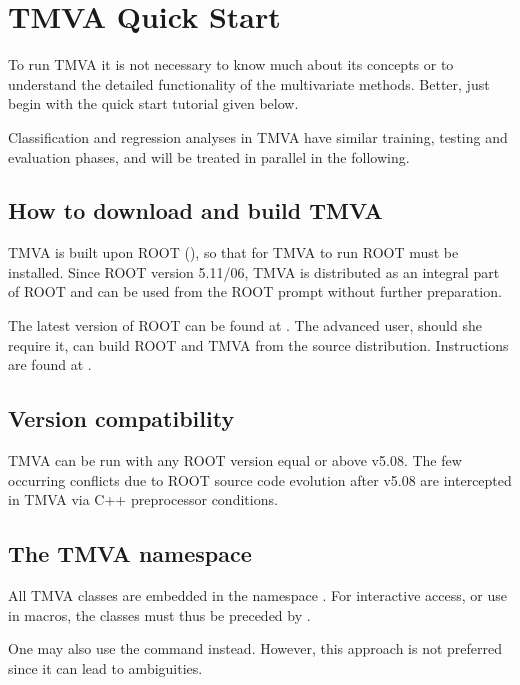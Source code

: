 \section{TMVA Quick Start}
\label{sec:quickstart}

To run TMVA it is not necessary to know much about its concepts or to understand 
the detailed functionality of the multivariate methods. Better, just begin 
with the quick start tutorial given below.

Classification and regression analyses in TMVA have similar training, testing and 
evaluation phases, and will be treated in parallel in the following. 

\subsection{How to download and build TMVA}
\label{sec:download}

TMVA is built upon ROOT (), so that for TMVA to run ROOT must be installed. Since ROOT version 5.11/06, TMVA is distributed as an integral part of ROOT and can be used from the ROOT prompt without further preparation.

The latest version of ROOT can be found at . The advanced user, should she require it, can build ROOT and TMVA from the source distribution. Instructions are found at .

\subsection{Version compatibility}
\label{sec:intro:compat}

TMVA can be run with any ROOT version equal or above v5.08.
The few occurring conflicts due to ROOT source code evolution after v5.08 are 
intercepted in TMVA via C++ preprocessor conditions.

\subsection{The TMVA namespace}
\label{sec:quickstart:namespace}

All TMVA classes are embedded in the namespace . For interactive access, or 
use in macros, the classes must thus be preceded by .

One may also use the command    instead. However, this approach is not preferred since it can lead to ambiguities.

